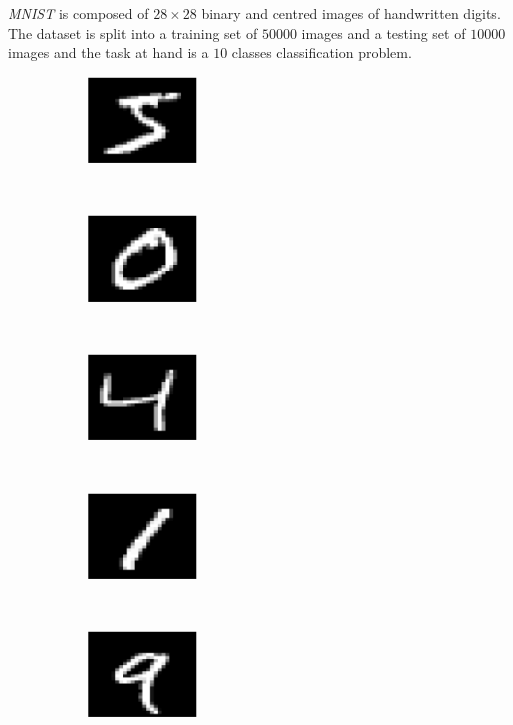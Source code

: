 \documentclass[a4paper,11pt]{report}
\begin{document}
    \textit{MNIST} is composed of $28 \times 28$ binary and centred images of handwritten digits. The dataset is split into a training set of $50000$ images and a testing set of $10000$ images and the task at hand is a $10$ classes classification problem.\\
    
		\begin{figure}[h]
			\centering
			\begin{subfigure}[t]{0.17\textwidth}
				\centering
				\includegraphics[height=0.9in]{mnist_1.eps}
			\end{subfigure}%
			~ 
			\begin{subfigure}[t]{0.17\textwidth}
        \centering
        \includegraphics[height=0.9in]{mnist_2.eps}
			\end{subfigure}
			~ 
			\begin{subfigure}[t]{0.17\textwidth}
        \centering
        \includegraphics[height=0.9in]{mnist_3.eps}
			\end{subfigure}
			~ 
			\begin{subfigure}[t]{0.17\textwidth}
        \centering
        \includegraphics[height=0.9in]{mnist_4.eps}
			\end{subfigure}
			~ 
			\begin{subfigure}[t]{0.17\textwidth}
        \centering
        \includegraphics[height=0.9in]{mnist_5.eps}

\end{subfigure}
\end{figure}
\end{document}
